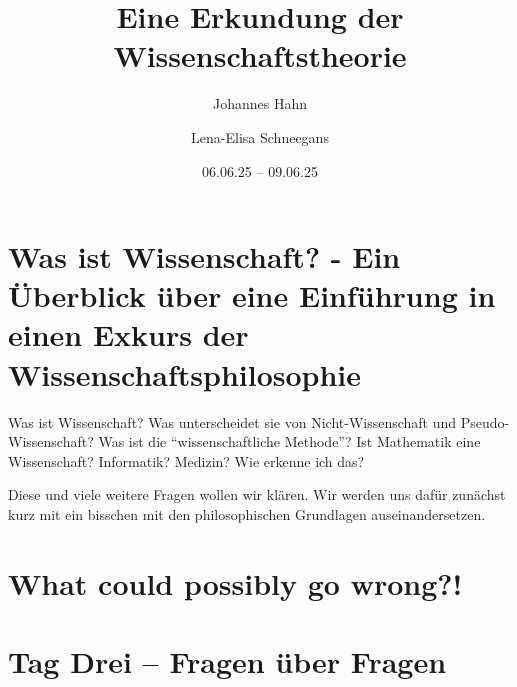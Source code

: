 \documentclass[fontsize=11pt,fleqn,a4paper]{scrartcl}
\author{Johannes Hahn \and Lena-Elisa Schneegans}
\title{Eine Erkundung der Wissenschaftstheorie}
\date{06.06.25 -- 09.06.25}
\begin{document}
\maketitle

\tableofcontents
\pagebreak


\section{Was ist Wissenschaft? - Ein Überblick über eine Einführung in einen Exkurs der Wissenschaftsphilosophie}


Was ist Wissenschaft? Was unterscheidet sie von Nicht-Wissenschaft und Pseudo-Wissenschaft? Was ist die
\enquote{wissenschaftliche Methode}? Ist Mathematik eine Wissenschaft? Informatik? Medizin? Wie erkenne ich das?

Diese und viele weitere Fragen wollen wir klären. Wir werden uns dafür zunächst kurz mit ein bisschen mit den
philosophischen Grundlagen auseinandersetzen.


\pagebreak


\section{What could possibly go wrong?!}



\pagebreak


\section{Tag Drei -- Fragen über Fragen}


\pagebreak
\printbibliography
\end{document}
